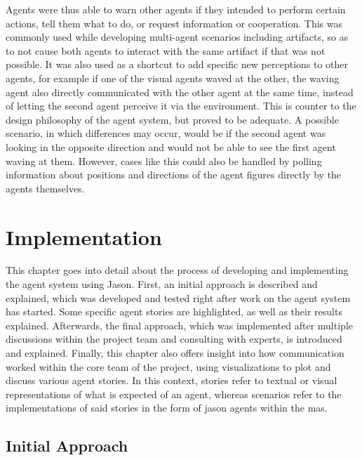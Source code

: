 \documentclass[draft,final]{vutinfth} %
\begin{document}
Agents were thus able to warn other agents if they intended to perform certain actions, tell them what to do, or request information or cooperation. 
This was commonly used while developing multi-agent scenarios including artifacts, so as to not cause both agents to interact with the same artifact if that was not possible. 
It was also used as a shortcut to add specific new perceptions to other agents, for example if one of the visual agents waved at the other, the waving agent also directly communicated with the other agent at the same time, instead of letting the second agent perceive it via the environment. 
This is counter to the design philosophy of the agent system, but proved to be adequate.
A possible scenario, in which differences may occur, would be if the second agent was looking in the opposite direction and would not be able to see the first agent waving at them. 
However, cases like this could also be handled by polling information about positions and directions of the \glspl{agent figure} directly by the agents themselves.

\chapter{Implementation}
\label{chap:implementation}

This chapter goes into detail about the process of developing and implementing the agent system using Jason. 
First, an initial approach is described and explained, which was developed and tested right after work on the agent system has started. 
Some specific agent stories are highlighted, as well as their results explained. 
Afterwards, the final approach, which was implemented after multiple discussions within the project team and consulting with experts, is introduced and explained. 
Finally, this chapter also offers insight into how communication worked within the core team of the project, using visualizations to plot and discuss various agent stories. 
In this context, stories refer to textual or visual representations of what is expected of an agent, whereas scenarios refer to the implementations of said stories in the form of \glspl{jason agent} within the \gls{mas}.

\section{Initial Approach}
\label{chap:initialapproach}
\end{document}
